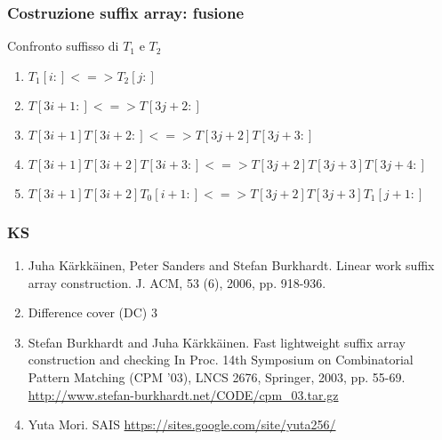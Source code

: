 \begin{frame}
	\frametitle{Costruzione suffix array: fusione}
	Confronto suffisso di $T_{1}$ e $T_{2}$
	\begin{enumerate}
		\item
		      $T_{1}[i:] <=> T_{2}[j:]$
		\item
		      $T[3i+1:] <=> T[3j+2:]$
		\item
		      $T[3i+1]T[3i+2:] <=> T[3j+2]T[3j+3:]$
		\item
		      $T[3i+1]T[3i+2]T[3i+3:] <=> T[3j+2]T[3j+3]T[3j+4:]$
		\item
		      $T[3i+1]T[3i+2]T_{0}[i+1:] <=> T[3j+2]T[3j+3]T_{1}[j+1:]$
	\end{enumerate}
\end{frame}

\begin{frame}
	\frametitle{KS}
	\begin{enumerate}
		\item
		      Juha Kärkkäinen, Peter Sanders and Stefan Burkhardt.
		      Linear work suffix array construction. J. ACM, 53 (6), 2006, pp. 918-936.
		\item
		      Difference cover (DC) 3
		\item
		      Stefan Burkhardt and Juha Kärkkäinen.
		      Fast lightweight suffix array construction and checking
		      In Proc. 14th Symposium on Combinatorial Pattern Matching (CPM '03), LNCS 2676,
		      Springer, 2003, pp. 55-69. \url{http://www.stefan-burkhardt.net/CODE/cpm_03.tar.gz}
		\item
		      Yuta Mori.
		      SAIS \url{https://sites.google.com/site/yuta256/}
	\end{enumerate}
\end{frame}




